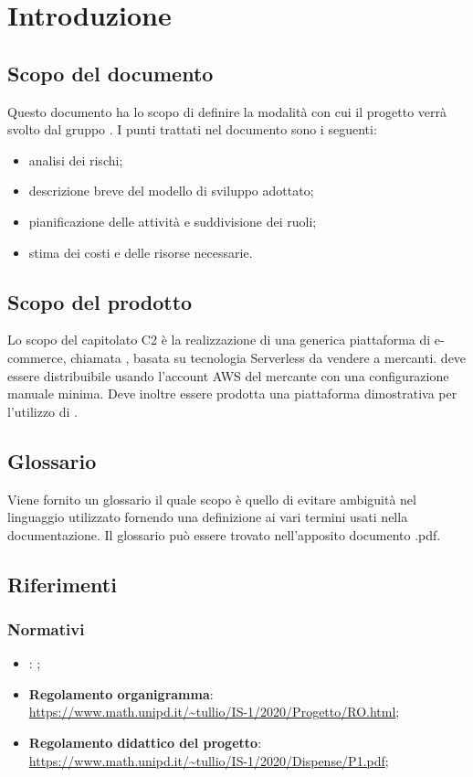 \section{Introduzione}
\subsection{Scopo del documento}
Questo documento ha lo scopo di definire la modalità con cui il progetto \nameproject{} verrà svolto dal gruppo \Omicron{}. I punti trattati nel documento sono i seguenti:
\begin{itemize}
\item analisi dei rischi;
\item descrizione breve del modello di sviluppo adottato;
\item pianificazione delle attività e suddivisione dei ruoli;
\item stima dei costi e delle risorse necessarie.
\end{itemize}
\subsection{Scopo del prodotto}
Lo scopo del capitolato C2 è la realizzazione di una generica piattaforma di e-commerce, chiamata \nameproject{}, basata su tecnologia Serverless da vendere a mercanti. \nameproject{} deve essere distribuibile usando l'account AWS del mercante con una configurazione manuale minima. Deve inoltre essere prodotta una piattaforma dimostrativa per l'utilizzo di \nameproject{}.
\subsection{Glossario}
Viene fornito un glossario il quale scopo è quello di evitare ambiguità nel linguaggio utilizzato fornendo una definizione ai vari termini usati nella documentazione. Il glossario può essere trovato nell'apposito documento \Glossario{}.pdf.
\subsection{Riferimenti}
\subsubsection{Normativi}
\begin{itemize}
\item \textbf{\NdP}: ;
\item \textbf{Regolamento organigramma}:\\ \url{https://www.math.unipd.it/~tullio/IS-1/2020/Progetto/RO.html};
\item \textbf{Regolamento didattico del progetto}:\\ \url{https://www.math.unipd.it/~tullio/IS-1/2020/Dispense/P1.pdf};
\end{itemize}

